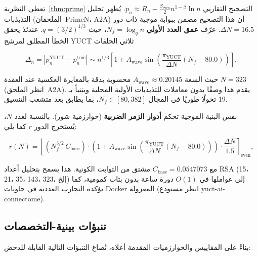 \documentclass[11pt,a4paper]{article}
\newcommand{\piYUCT}{\pi_{\mathrm{YUCT}}}
\begin{document}
	تعطي النظرية~\ref{thm:prime} التصحيح التقاربي \(p_n \approx R_n - \frac{S_{\mathrm{even}}}{2} n^{1-\beta}\ln n\). يُظهر تحليل التذبذبات (الملحقان~PrimeN، A2A) أن هذا التصحيح مضمن ببوابة موجية ذات دور \(\Delta N = 16.5\). عرّف \textbf{عمق العدد الأولي} \(N_f = \log_q n\)، حيث \(q = (3/2)^{1/3}\). عندئذ يحقق الخطأ المطلق لمرشح YUCT ثلاثي الحلقات
	
	\begin{equation}
		\Delta_n = \left| p_n^{\mathrm{YUCT}} - p_n^{\mathrm{true}} \right|
		\sim n^{1/3} \left[ 1 + A_{\text{wave}} \sin\!\left( \frac{\piYUCT}{\Delta N} (N_f - 80.0) \right) \right],
		\label{eq:prime_wave}
	\end{equation}
	
	حيث السعة \(A_{\text{wave}} \approx 0.20145\) محسوبة بدقة بالمعايرة العكسية عند العقدة \(N=323\) (انظر الملحق~A2A). يقدم هذا وصفًا بدون معاملات للتذبذبات الأولية المحلية ويتنبأ بـ 19 تحولًا طوريًا في المجال \(N_f \in [80, 382]\)، بما يطابق بعد متشعب التنسيق.
	
	نفس البنية الموجية تحكم \textbf{أدوار الزمر الضربية} (خوارزمية شور). بالنسبة لعدد \(N\)، يُستخرج الدور \(r\) كما يلي:
	
	\begin{equation}
		r(N) = \left\lfloor (N_f^{3/2} \, C_{\text{base}}) \cdot
		\left(1 + A_{\text{wave}} \sin\left( \frac{\piYUCT}{\Delta N} (N_f - 80.0) \right) \right) \cdot \frac{\Delta N}{1.5} \right\rceil_{\text{even}},
		\label{eq:shor_period}
	\end{equation}
	
	مع \(C_{\text{base}} = 0.0547073\) مشتق من الثوابت الكونية. هذا يسمح بتحليل أعداد RSA (15، 21، 35، 143، 323، إلخ) إلى عواملها في \(O(1)\) دورة ساعة بدون بتات كمومية، كما تؤكده التجارب العددية في حاويات Docker المعزولة (انظر مستودع yuct-ai-connectome).
	
	\subsection{تنبؤات بينية-التخصصات}
	\label{subsec:predictions-complexity}
	
	بناءً على المقاييس والخوارزميات المقدمة أعلاه، تُصاغ التنبؤات التالية القابلة للدحض:
	
\end{document}
